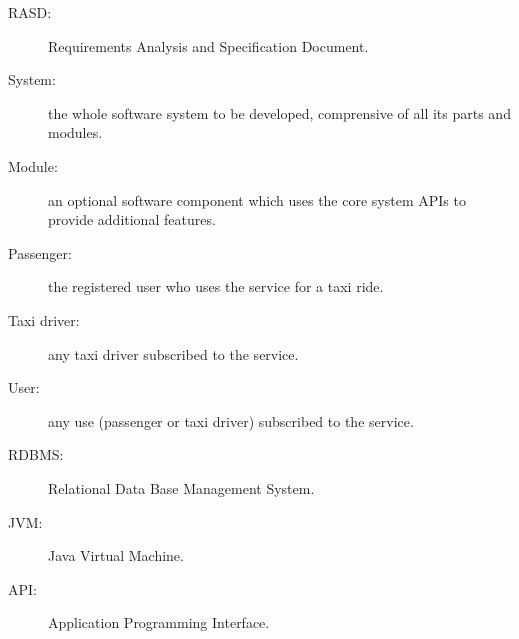 \begin{description}
\item[RASD:] Requirements Analysis and Specification Document.
\item[System:] the whole software system to be developed, comprensive of all its parts and modules.
\item[Module:] an optional software component which uses the core system APIs to provide additional features.
\item[Passenger:] the registered user who uses the service for a taxi ride.
\item[Taxi driver:] any taxi driver subscribed to the service.
\item[User:] any use (passenger or taxi driver) subscribed to the service.
\item[RDBMS:] Relational Data Base Management System.
\item[JVM:] Java Virtual Machine.
\item[API:] Application Programming Interface.
\end{description}